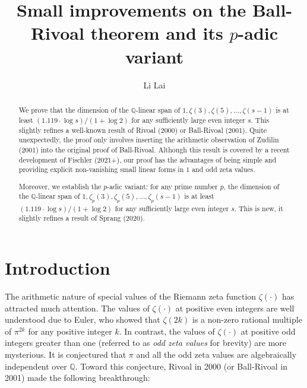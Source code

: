 \documentclass[12pt]{article}
\numberwithin{equation}{section}
\begin{document}
\title {Small improvements on the Ball-Rivoal theorem and its $p$-adic variant}

\author{Li Lai}
\date{}

\maketitle

\begin{abstract}
We prove that the dimension of the $\mathbb{Q}$-linear span of $1,\zeta(3),\zeta(5),\ldots,\zeta(s-1)$ is at least $(1.119 \cdot \log s)/(1+\log 2)$ for any sufficiently large even integer $s$. This slightly refines a well-known result of Rivoal (2000) or Ball-Rivoal (2001). Quite unexpectedly, the proof only involves inserting the arithmetic observation of Zudilin (2001) into the original proof of Ball-Rivoal. Although this result is covered by a recent development of Fischler (2021+), our proof has the advantages of being simple and providing explicit non-vanishing small linear forms in $1$ and odd zeta values. 

Moreover, we establish the $p$-adic variant: for any prime number $p$, the dimension of the $\mathbb{Q}$-linear span of $1,\zeta_p(3),\zeta_p(5),\ldots,\zeta_p(s-1)$ is at least $(1.119 \cdot \log s)/(1+\log 2)$ for any sufficiently large even integer $s$. This is new, it slightly refines a result of Sprang (2020).
\end{abstract}



\section{Introduction}

The arithmetic nature of special values of the Riemann zeta function $\zeta(\cdot)$ has attracted much attention. The values of $\zeta(\cdot)$ at positive even integers are well understood due to Euler, who showed that $\zeta(2k)$ is a non-zero rational multiple of $\pi^{2k}$ for any positive integer $k$. In contrast, the values of $\zeta(\cdot)$ at positive odd integers greater than one (referred to as \emph{odd zeta values} for brevity) are more mysterious. It is conjectured that $\pi$ and all the odd zeta values are algebraically independent over $\mathbb{Q}$. Toward this conjecture, Rivoal in 2000 (or Ball-Rivoal in 2001) made the following breakthrough:
\end{document}
